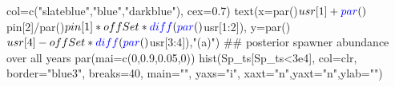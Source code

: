 \documentclass[
  11pt,
]{article}
\newenvironment{Shaded}{}{}
\newcommand{\CommentTok}[1]{\textcolor[rgb]{0.00,0.50,0.00}{#1}}
\newcommand{\DataTypeTok}[1]{#1}
\newcommand{\DecValTok}[1]{#1}
\newcommand{\FloatTok}[1]{#1}
\newcommand{\KeywordTok}[1]{\textcolor[rgb]{0.00,0.00,1.00}{#1}}
\newcommand{\NormalTok}[1]{#1}
\newcommand{\OperatorTok}[1]{#1}
\newcommand{\StringTok}[1]{\textcolor[rgb]{0.00,0.50,0.50}{#1}}
\begin{document}
\begin{Shaded}
\begin{Highlighting}[]
{{     \DataTypeTok{col=}\KeywordTok{c}\NormalTok{(}\StringTok{"slateblue"}\NormalTok{,}\StringTok{"blue"}\NormalTok{,}\StringTok{"darkblue"}\NormalTok{), }\DataTypeTok{cex=}\FloatTok{0.7}\NormalTok{)}
\KeywordTok{text}\NormalTok{(}\DataTypeTok{x=}\KeywordTok{par}\NormalTok{()}\OperatorTok{$}\NormalTok{usr[}\DecValTok{1}\NormalTok{]}\OperatorTok{+}\KeywordTok{par}\NormalTok{()}\OperatorTok{$}\NormalTok{pin[}\DecValTok{2}\NormalTok{]}\OperatorTok{/}\KeywordTok{par}\NormalTok{()}\OperatorTok{$}\NormalTok{pin[}\DecValTok{1}\NormalTok{]}\OperatorTok{*}\NormalTok{offSet}\OperatorTok{*}\KeywordTok{diff}\NormalTok{(}\KeywordTok{par}\NormalTok{()}\OperatorTok{$}\NormalTok{usr[}\DecValTok{1}\OperatorTok{:}\DecValTok{2}\NormalTok{]),}
     \DataTypeTok{y=}\KeywordTok{par}\NormalTok{()}\OperatorTok{$}\NormalTok{usr[}\DecValTok{4}\NormalTok{]}\OperatorTok{-}\NormalTok{offSet}\OperatorTok{*}\KeywordTok{diff}\NormalTok{(}\KeywordTok{par}\NormalTok{()}\OperatorTok{$}\NormalTok{usr[}\DecValTok{3}\OperatorTok{:}\DecValTok{4}\NormalTok{]),}\StringTok{"(a)"}\NormalTok{)}
\CommentTok{## posterior spawner abundance over all years}
\KeywordTok{par}\NormalTok{(}\DataTypeTok{mai=}\KeywordTok{c}\NormalTok{(}\DecValTok{0}\NormalTok{,}\FloatTok{0.9}\NormalTok{,}\FloatTok{0.05}\NormalTok{,}\DecValTok{0}\NormalTok{))}
\KeywordTok{hist}\NormalTok{(Sp_ts[Sp_ts}\OperatorTok{<}\FloatTok{3e4}\NormalTok{], }\DataTypeTok{col=}\NormalTok{clr, }\DataTypeTok{border=}\StringTok{"blue3"}\NormalTok{, }\DataTypeTok{breaks=}\DecValTok{40}\NormalTok{,}
     \DataTypeTok{main=}\StringTok{""}\NormalTok{, }\DataTypeTok{yaxs=}\StringTok{"i"}\NormalTok{, }\DataTypeTok{xaxt=}\StringTok{"n"}\NormalTok{,}\DataTypeTok{yaxt=}\StringTok{"n"}\NormalTok{,}\DataTypeTok{ylab=}\StringTok{""}\NormalTok{)}

}}
\end{Highlighting}
\end{Shaded}
\end{document}
